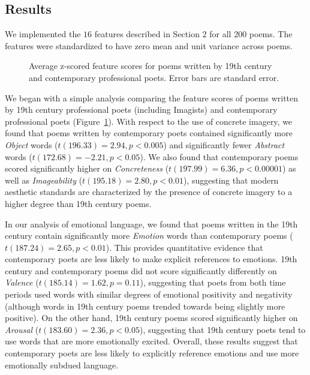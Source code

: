 \documentclass{book}
\begin{document}
\subsection{Results}

We implemented the $16$ features described in Section 2 for all $200$ poems. The features were standardized to have zero mean and unit variance across poems. 

\begin{figure}
\label{fig1}
\caption{Average z-scored feature scores for poems written by 19th century and contemporary professional poets. Error bars are standard error.} 
\end{figure}

We began with a simple analysis comparing the feature scores of poems written by 19th century professional poets (including Imagists) and contemporary professional poets (Figure~\ref{fig1}). With respect to the use of concrete imagery, we found that poems written by contemporary poets contained significantly more \emph{Object} words ($t(196.33) = 2.94, p < 0.005$) and significantly fewer \emph{Abstract} words ($t(172.68) = -2.21, p < 0.05$).
We also found that contemporary poems scored significantly higher on \emph{Concreteness} ($t(197.99) = 6.36, p < 0.00001$) as well as \emph{Imageability} ($t(195.18) = 2.80, p < 0.01$), suggesting that modern aesthetic standards are characterized by the presence of concrete imagery to a higher degree than 19th century poems.

In our analysis of emotional language, we found that poems written in the 19th century contain significantly more \emph{Emotion} words than contemporary poems ($t(187.24) = 2.65, p < 0.01$). This provides quantitative evidence that contemporary poets are less likely to make explicit references to emotions. 19th century and contemporary poems did not score significantly differently on \emph{Valence} ($t(185.14) = 1.62, p = 0.11$), suggesting that poets from both time periods used words with similar degrees of emotional positivity and negativity (although words in 19th century poems trended towards being slightly more positive). On the other hand, 19th century poems scored significantly higher on \emph{Arousal} ($t(183.60) = 2.36, p < 0.05$), suggesting that 19th century poets tend to use words that are more emotionally excited. Overall, these results suggest that contemporary poets are less likely to explicitly reference emotions and use more emotionally subdued language. 
\end{document}
